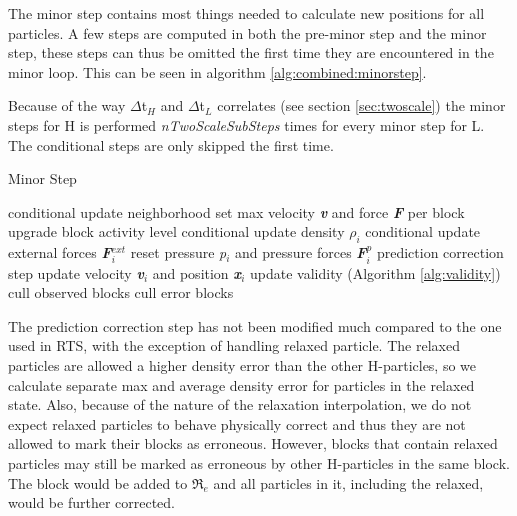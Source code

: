 \documentclass[../../main.tex]{subfiles}
\begin{document}
The minor step contains most things needed to calculate new positions for all particles. A few steps are computed in both the pre-minor step and the minor step, these steps can thus be omitted the first time they are encountered in the minor loop. This can be seen in algorithm \ref{alg:combined:minorstep}. 

Because of the way $\Delta$t$_H$ and $\Delta$t$_L$ correlates (see section \ref{sec:twoscale}) the minor steps for H is performed \textit{nTwoScaleSubSteps} times for every minor step for L. The conditional steps are only skipped the first time. 

\begin{algorithm}[h]
    \caption{Minor Step}
    \label{alg:combined:minorstep}
    \begin{algorithmic}[1]
        \State conditional update neighborhood 
        \State set max velocity \textbf{\textit{v}} and force \textbf{\textit{F}} per block
        \State upgrade block activity level
            \State conditional update density $\rho_i$
        \EndFor
            \State conditional update external forces \textbf{\textit{F}}$^{ext}_i$
        \EndFor
    \EndIf
        \State reset pressure \textit{p$_i$} and pressure forces \textbf{\textit{F}}$^{p}_i$
    \EndFor
    \State prediction correction step
        \State update velocity \textbf{\textit{v$_i$}} and position \textbf{\textit{x$_i$}}
    \EndFor
    \State update validity (Algorithm \ref{alg:validity})
    \State cull observed blocks
	\State cull error blocks
   \end{algorithmic}
\end{algorithm}

The prediction correction step has not been modified much compared to the one used in RTS, with the exception of handling relaxed particle. The relaxed particles are allowed a higher density error than the other H-particles, so we calculate separate max and average density error for particles in the relaxed state. Also, because of the nature of the relaxation interpolation, we do not expect relaxed particles to behave physically correct and thus they are not allowed to mark their blocks as erroneous. However, blocks that contain relaxed particles may still be marked as erroneous by other H-particles in the same block. The block would be added to $\Re_e$ and all particles in it, including the relaxed, would be further corrected.
\end{document}
